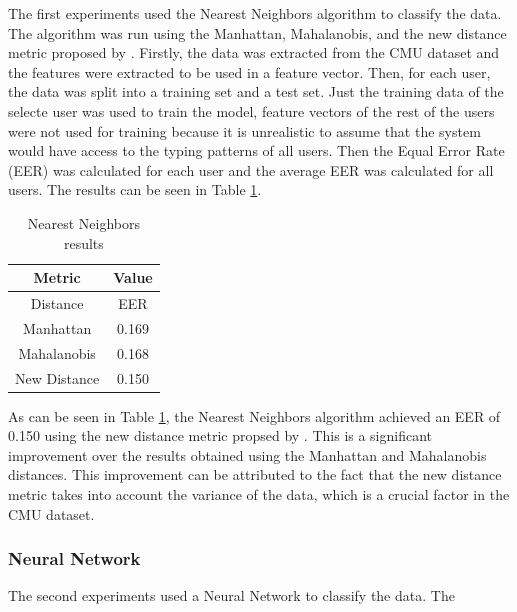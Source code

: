 The first experiments used the Nearest Neighbors algorithm to classify the data. The algorithm was run using the Manhattan, Mahalanobis, and the new distance metric proposed by \cite{combine_distance}. Firstly, the data was extracted from the CMU dataset and the features were extracted to be used in a feature vector. Then, for each user, the data was split into a training set and a test set. Just the training data of the selecte user was used to train the model, feature vectors of the rest of the users were not used for training because it is unrealistic to assume that the system would have access to the typing patterns of all users. Then the Equal Error Rate (EER) was calculated for each user and the average EER was calculated for all users. The results can be seen in Table \ref{tab:nn_results}.

\begin{table}[h]
    \centering
    \begin{tabular}{|c|c|}
        \hline
        \textbf{Metric} & \textbf{Value} \\
        \hline
        Distance & EER \\
        \hline
        Manhattan & 0.169 \\
        \hline
        Mahalanobis & 0.168 \\
        \hline
        New Distance & 0.150 \\
    \end{tabular}
    \caption{Nearest Neighbors results}
    \label{tab:nn_results}

\end{table}

As can be seen in Table \ref{tab:nn_results}, the Nearest Neighbors algorithm achieved an EER of 0.150 using the new distance metric propsed by \cite{combine_distance}. This is a significant improvement over the results obtained using the Manhattan and Mahalanobis distances. This improvement can be attributed to the fact that the new distance metric takes into account the variance of the data, which is a crucial factor in the CMU dataset.

\subsubsection{Neural Network}

The second experiments used a Neural Network to classify the data. The 